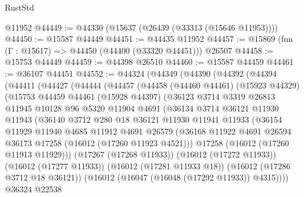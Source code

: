 \begin{lexlean}{RustStd}
\begin{coremodule}
    @11952
@44449 := @44330 (@15637 (@26439 (@33313 (@15646 @11953))))
@44450 := @15587 @44449
@44451 := @44435 @11952
@44457 := @15869 (fun (Γ : @15617) => @44450 (@44400 (@33320 @44451))) @26507
@44458 := @15753 @44449
@44459 := @44398 @26510
@44460 := @15587 @44459
@44461 := @36107 @44451
@44552 := @44324
    (@44349
      (@44390
        (@44392
          (@44394
            (@44411
              (@44427
                (@44444
                  (@44457
                    (@44458
                      (@44460 @44461)
                      (@15923 @44329)
                      (@15753
                        @44459
                        @44461
                        (@15928 @44397)
                        (@36123
                          @3714
                          @3319
                          @26813
                          @11945
                          @10128
                          @96
                          @5320
                          @11904
                          @4691
                          (@36134
                            @3714
                            @36121
                            @11930
                            @11943
                            (@36140
                              @3712
                              @280
                              @18
                              @36121
                              @11930
                              @11941
                              @11933
                              (@36154
                                @11929
                                @11940
                                @4685
                                @11912
                                @4691
                                @26579
                                (@36168
                                  @11922
                                  @4691
                                  @26594
                                  @36173
                                  @17258
                                  (@16012 (@17260 @11923 @4521)))
                                @17258
                                (@16012 (@17260 @11913 @11929)))
                              (@17267 (@17268 @11933))
                              (@16012 (@17272 @11933))
                              (@16012 (@17277 @11933))
                              (@16012 (@17281 @11933 @18))
                              (@16012 (@17286 @3712 @18 @36121))
                              (@16012 (@16047 (@16048 (@17292 @11933)) @4315))))
                          @36324
                          @22538

\end{coremodule}
\end{lexlean}
